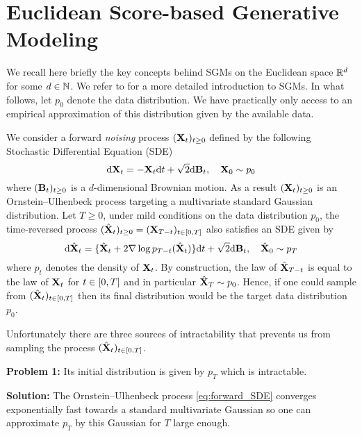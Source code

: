 \section{Euclidean Score-based Generative Modeling}
\label{sec:eucl-sgm-riem}

We recall here briefly the key concepts behind SGMs on the Euclidean space $\mathbb{R}^d$ for some $d \in \mathbb{N}$. We refer to \cite{song2020score,song2019generative,debortoli2021neurips} for a more detailed introduction to SGMs. In what follows, let $p_0$ denote the
data distribution. We have practically only access to an empirical approximation of this distribution given by the available data.


We consider a forward
\emph{noising} process $(\mathbf{X}_t)_{t \geq 0}$ defined by the following Stochastic
Differential Equation (SDE)
\begin{equation}\label{eq:forward_SDE}
  \mathrm{d} \mathbf{X}_t = -\mathbf{X}_t \mathrm{d} t + \sqrt{2} \mathrm{d} \mathbf{B}_t,\quad \mathbf{X}_0 \sim p_0 
\end{equation}
where $(\mathbf{B}_t)_{t \geq 0}$ is a $d$-dimensional Brownian motion. As a result
$(\mathbf{X}_t)_{t \geq 0}$ is an Ornstein--Ulhenbeck process targeting a multivariate standard Gaussian
distribution. Let $T \geq0$, under
mild conditions on the data distribution $p_0$, the time-reversed process
$(\hat{\mathbf{X}}_t)_{t \geq 0} = (\mathbf{X}_{T-t})_{t \in \left[0,T\right]}$ also satisfies an SDE
\citep{cattiaux2021time,haussmann1986time} given by
\begin{equation} \label{eq:backward_SDE}
  \mathrm{d} \hat{\mathbf{X}}_t = \{ \hat{\mathbf{X}}_t + 2 \nabla \log p_{T-t}(\hat{\mathbf{X}}_t)\} \mathrm{d} t + \sqrt{2} \mathrm{d} \mathbf{B}_t,\quad \hat{\mathbf{X}}_0 \sim p_T 
\end{equation}
where $p_t$ denotes the density of $\mathbf{X}_t$. By construction, the law of $\hat{\mathbf{X}}_{T-t}$ is equal to the law of $\mathbf{X}_t$ for $t \in \left[0,T\right]$ and in particular $\hat{\mathbf{X}}_{T}\sim p_0$. Hence, if one could sample from
$(\hat{\mathbf{X}}_t)_{t \in \left[0,T\right]}$ then its final distribution would be the target
data distribution $p_0$.  

Unfortunately there are three sources of intractability that prevents us from sampling the process $(\hat{\mathbf{X}}_t)_{t \in \left[0,T\right]}$. 

\textbf{Problem 1:} Its initial distribution is given by $p_T$ which is intractable.

\textbf{Solution:} The Ornstein--Ulhenbeck process \eqref{eq:forward_SDE} converges exponentially fast towards a standard multivariate Gaussian so one can approximate $p_T$ by this Gaussian for $T$ large enough. 

